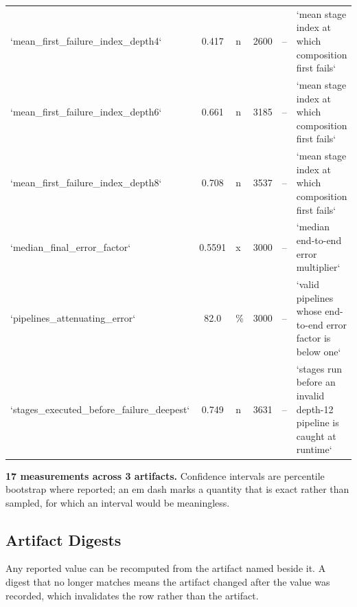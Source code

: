 \documentclass[10pt,journal,compsoc,twocolumn]{IEEEtran}
\begin{document}
\begin{table}[htbp]
{\begin{tabular}{lclcll}
`mean\_first\_failure\_index\_depth4` & 0.417 & n & 2600 & -- & `mean stage index at which composition first fails` \\
`mean\_first\_failure\_index\_depth6` & 0.661 & n & 3185 & -- & `mean stage index at which composition first fails` \\
`mean\_first\_failure\_index\_depth8` & 0.708 & n & 3537 & -- & `mean stage index at which composition first fails` \\
`median\_final\_error\_factor` & 0.5591 & x & 3000 & -- & `median end-to-end error multiplier` \\
`pipelines\_attenuating\_error` & 82.0 & \% & 3000 & -- & `valid pipelines whose end-to-end error factor is below one` \\
`stages\_executed\_before\_failure\_deepest` & 0.749 & n & 3631 & -- & `stages run before an invalid depth-12 pipeline is caught at runtime` \\
\bottomrule
\end{tabular}}
\end{table}

\textbf{17 measurements across 3 artifacts.} Confidence intervals are percentile bootstrap where reported; an em dash marks a quantity that is exact rather than sampled, for which an interval would be meaningless.


\subsection{Artifact Digests}
\begin{table}[htbp]
\centering
{}
\end{table}

Any reported value can be recomputed from the artifact named beside it. A digest that no longer matches means the artifact changed after the value was recorded, which invalidates the row rather than the artifact.


\par\vspace{0.5em}



\end{document}
